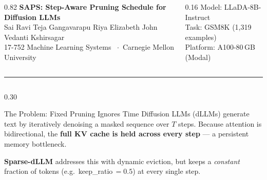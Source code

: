 \documentclass[final]{beamer}
\newcommand{\sep}{\vspace{0.8em}}
\begin{document}
\begin{frame}[t]{}

\begin{columns}[t]
  \begin{column}{0.82\linewidth}
    {\color{cmuRed}\Huge\bfseries SAPS: Step-Aware Pruning Schedule for Diffusion LLMs}\\[0.4em]
    {\Large Sai Ravi Teja Gangavarapu \quad Riya Elizabeth John \quad Vedanti Kshirsagar}\\[0.2em]
    {\large 17-752 Machine Learning Systems \ $\cdot$\ Carnegie Mellon University}
  \end{column}
  \begin{column}{0.16\linewidth}
    \raggedleft
    {\color{cmuGray}\large Model: LLaDA-8B-Instruct\\
                    Task: GSM8K (1{,}319 examples)\\
                    Platform: A100-80\,GB (Modal)}
  \end{column}
\end{columns}

\vspace{1.2em}
\rule{\linewidth}{2pt}
\vspace{0.8em}

\begin{columns}[t,totalwidth=\linewidth]

\begin{column}{0.30\linewidth}

  \begin{block}{The Problem: Fixed Pruning Ignores Time}
    Diffusion LLMs (dLLMs) generate text by iteratively denoising a
    masked sequence over $T$ steps. Because attention is bidirectional,
    the \textbf{full KV cache is held across every step} — a persistent
    memory bottleneck.

    \sep
    \textbf{Sparse-dLLM} addresses this with dynamic eviction, but keeps a
    \emph{constant} fraction of tokens (e.g.\ keep\_ratio\,$= 0.5$) at
    every single step.

    \begin{center}
    \end{center}


\end{block}
\end{column}
\end{columns}
\end{frame}
\end{document}
